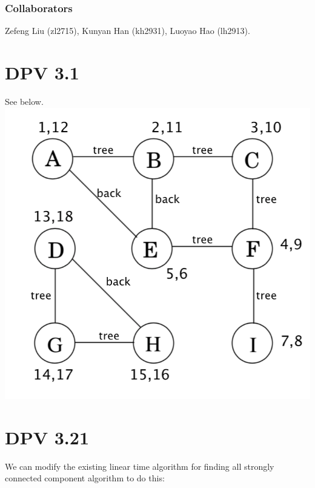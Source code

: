 \documentclass[twoside]{homework}
\begin{document}
\maketitle
\subsubsection*{Collaborators}
Zefeng Liu (zl2715), Kunyan Han (kh2931), Luoyao Hao (lh2913).

\section{DPV 3.1}
See below.\\
\includegraphics[width=.5\textwidth]{3-1.png}

\section{DPV 3.21}
We can modify the existing linear time algorithm for finding all strongly connected component algorithm to do this:
\end{document}
